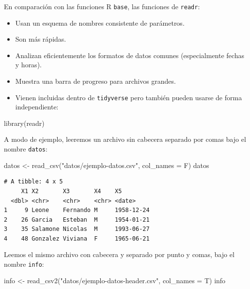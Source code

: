 \documentclass[
  spanish,
  a4paper,
]{scrbook}
\newenvironment{Shaded}{\begin{snugshade}}{\end{snugshade}}
\newcommand{\AttributeTok}[1]{\textcolor[rgb]{0.40,0.45,0.13}{#1}}
\newcommand{\FunctionTok}[1]{\textcolor[rgb]{0.28,0.35,0.67}{#1}}
\newcommand{\NormalTok}[1]{\textcolor[rgb]{0.00,0.23,0.31}{#1}}
\newcommand{\OtherTok}[1]{\textcolor[rgb]{0.00,0.23,0.31}{#1}}
\newcommand{\StringTok}[1]{\textcolor[rgb]{0.13,0.47,0.30}{#1}}
\begin{document}
En comparación con las funciones R \texttt{base}, las funciones de
\texttt{readr}:

\begin{itemize}
\item
  Usan un esquema de nombres consistente de parámetros.
\item
  Son más rápidas.
\item
  Analizan eficientemente los formatos de datos comunes (especialmente
  fechas y horas).
\item
  Muestra una barra de progreso para archivos grandes.
\item
  Vienen incluidas dentro de \texttt{tidyverse} pero también pueden
  usarse de forma independiente:
\end{itemize}

\begin{Shaded}
\begin{Highlighting}[]
\FunctionTok{library}\NormalTok{(readr)}
\end{Highlighting}
\end{Shaded}

A modo de ejemplo, leeremos un archivo sin cabecera separado por comas
bajo el nombre \texttt{datos}:

\begin{Shaded}
\begin{Highlighting}[]
\NormalTok{datos }\OtherTok{\textless{}{-}} \FunctionTok{read\_csv}\NormalTok{(}\StringTok{"datos/ejemplo{-}datos.csv"}\NormalTok{, }\AttributeTok{col\_names =}\NormalTok{ F)}
\NormalTok{datos}
\end{Highlighting}
\end{Shaded}

\begin{verbatim}
# A tibble: 4 x 5
     X1 X2       X3       X4    X5        
  <dbl> <chr>    <chr>    <chr> <date>    
1     9 Leone    Fernando M     1958-12-24
2    26 Garcia   Esteban  M     1954-01-21
3    35 Salamone Nicolas  M     1993-06-27
4    48 Gonzalez Viviana  F     1965-06-21
\end{verbatim}

Leemos el mismo archivo con cabecera y separado por punto y comas, bajo
el nombre \texttt{info}:

\begin{Shaded}
\begin{Highlighting}[]
\NormalTok{info }\OtherTok{\textless{}{-}} \FunctionTok{read\_csv2}\NormalTok{(}\StringTok{"datos/ejemplo{-}datos{-}header.csv"}\NormalTok{, }\AttributeTok{col\_names =}\NormalTok{ T)}
\NormalTok{info}
\end{Highlighting}
\end{Shaded}
\end{document}
